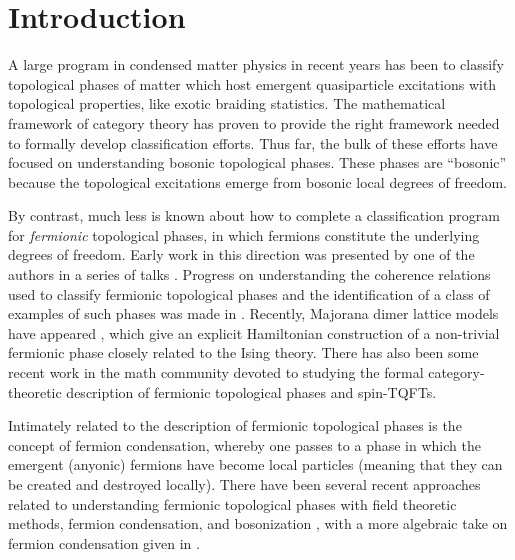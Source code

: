 
\section{Introduction}

A large program in condensed matter physics in recent years has been to classify 
topological phases of matter which host emergent quasiparticle excitations 
with topological properties, like exotic braiding statistics. 
The mathematical framework of category theory has proven to provide the right 
framework needed to formally develop classification efforts. 
Thus far, the bulk of these efforts have focused on understanding bosonic topological phases.
These phases are ``bosonic'' because the topological excitations emerge from bosonic 
local degrees of freedom.

By contrast, much less is known about how to complete a classification program for {\it fermionic} topological phases, in which fermions constitute 
the underlying degrees of freedom. 
Early work in this direction was presented by one of the authors in a series of talks \cite{Walker2013,Walker2014,Walker2015}.
Progress on understanding the coherence relations used to classify fermionic topological phases and the identification of a class of examples of such phases was made in \cite{gu2015,gu2014,Lan2016b}. 
Recently, Majorana dimer lattice models have appeared \cite{Freedman2011a,tarantino2016,ware2016}, 
which give an explicit Hamiltonian construction of a 
non-trivial fermionic phase closely related to the Ising theory. 
There has also been some recent work in the math community \cite{usher2016,brundan2016,bruillard2017,bonderson2017} 
devoted to studying the formal category-theoretic description of fermionic topological phases and spin-TQFTs. 

Intimately related to the description of fermionic topological phases is the concept of fermion condensation, 
whereby one passes to a phase in which the emergent (anyonic) fermions have become 
local particles (meaning that they can be created and destroyed locally). 
There have been several recent approaches related to understanding 
fermionic topological phases with field theoretic methods, fermion condensation, and bosonization \cite{Barkeshli2014b,barkeshli2015,gaiotto2016, bhardwaj2016, bhardwaj2016b,kapustin2017,putrov2016}, 
with a more algebraic take on fermion condensation given in \cite{wan2016}. 


